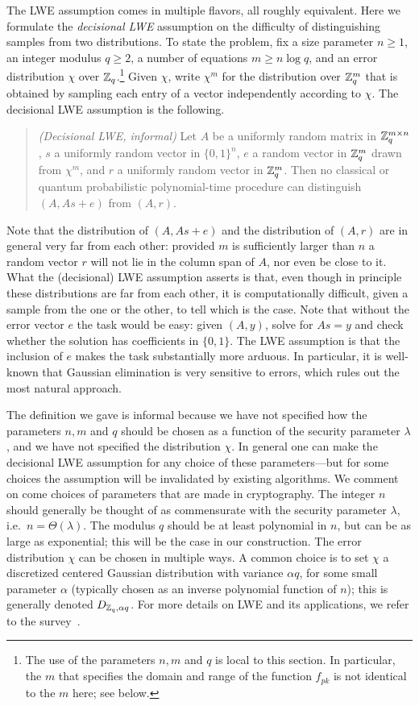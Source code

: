The LWE assumption comes in multiple flavors, all roughly equivalent. Here we formulate the \emph{decisional LWE} assumption on the difficulty of distinguishing samples from two distributions. To state the problem, fix a size parameter $n\geq 1$, an integer modulus $q\geq 2$, a number of equations $m\geq n\log q$, and an error distribution $\chi$ over $\mathbb{Z}_q$.\footnote{The use of the parameters $n,m$ and $q$ is local to this section. In particular, the $m$ that specifies the domain and range of the function $f_{pk}$ is not identical to the $m$ here; see below.} Given $\chi$, write $\chi^m$ for the distribution over $\mathbb{Z}_q^m$ that is obtained by sampling each entry of a vector independently according to $\chi$. The decisional LWE assumption is the following.

\begin{quote}\emph{(Decisional LWE, informal)} Let $A$ be a uniformly random matrix in $\mathbb{Z}_q^{m\times n}$, $s$ a uniformly random vector in $\{0,1\}^n$, $e$ a random vector in $\mathbb{Z}_q^m$ drawn from $\chi^m$, and $r$ a uniformly random vector in $\mathbb{Z}_q^m$. Then no classical or quantum probabilistic polynomial-time procedure can distinguish  $(A,As+e)$ from $(A,r)$.
\end{quote}

Note that the distribution of $(A,As+e)$ and the distribution of $(A,r)$ are in general very far from each other: provided $m$ is sufficiently larger than $n$ a random vector $r$ will not lie in the column span of $A$, nor even be close to it. What the (decisional) LWE assumption asserts is that, even though in principle these distributions are far from each other, it is computationally difficult, given a sample from the one or the other, to tell which is the case.  Note that without the error vector $e$ the task would be easy: given $(A,y)$, solve for $As=y$ and check whether the solution has coefficients in $\{0,1\}$. The LWE assumption is that the inclusion of $e$ makes the task substantially more arduous. In particular, it is well-known that Gaussian elimination is very sensitive to errors, which rules out the most natural approach. 

The definition we gave is informal because we have not specified how the parameters $n,m$ and $q$ should be chosen as a function of the security parameter $\lambda$, and we have not specified the distribution $\chi$. In general one can make the decisional LWE assumption for any choice of these parameters---but for some choices the assumption will be invalidated by existing algorithms. We comment on come choices of parameters that are made in cryptography. The integer $n$ should generally be thought of as commensurate with the security parameter $\lambda$, i.e.\ $n=\Theta(\lambda)$. The modulus $q$ should be at least polynomial in $n$, but can be as large as exponential; this will be the case in our construction. The error distribution $\chi$ can be chosen in multiple ways. A common choice is to set $\chi$ a discretized centered Gaussian distribution with variance $\alpha q$, for some small parameter $\alpha$ (typically chosen as an inverse polynomial function of $n$); this is generally denoted $D_{\mathbb{Z}_q,\alpha q}$. For more details on LWE and its applications, we refer to the survey~\cite{peikert2016decade}. 

